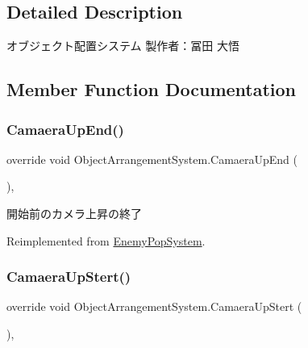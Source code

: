 \subsection{Detailed Description}
オブジェクト配置システム 製作者：冨田 大悟 



\subsection{Member Function Documentation}
\mbox{\label{class_object_arrangement_system_ab4a0e5a7a8e5488cbae90f485bb86e5f}} 
\subsubsection{\texorpdfstring{Camaera\+Up\+End()}{CamaeraUpEnd()}}
{\footnotesize\ttfamily override void Object\+Arrangement\+System.\+Camaera\+Up\+End (\begin{DoxyParamCaption}{ }\end{DoxyParamCaption})\hspace{0.3cm}{\ttfamily [inline]}, {\ttfamily [virtual]}}



開始前のカメラ上昇の終了 



Reimplemented from \hyperlink{class_enemy_pop_system_a86c3886d3f4603c9acf3356afadcc72a}{Enemy\+Pop\+System}.

\mbox{\label{class_object_arrangement_system_a98764c494fecf8dce4726107d4539374}} 
\subsubsection{\texorpdfstring{Camaera\+Up\+Stert()}{CamaeraUpStert()}}
{\footnotesize\ttfamily override void Object\+Arrangement\+System.\+Camaera\+Up\+Stert (\begin{DoxyParamCaption}{ }\end{DoxyParamCaption})\hspace{0.3cm}{\ttfamily [inline]}, {\ttfamily [virtual]}}



